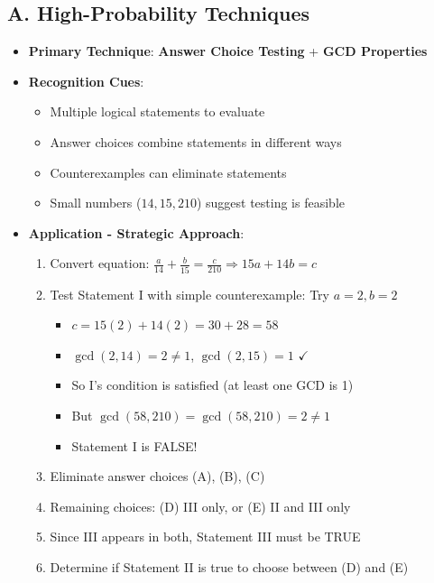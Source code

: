 \documentclass[12pt]{article}
\begin{document}
\begin{techniquesbox}
\subsection*{A. High-Probability Techniques}
\begin{itemize}[leftmargin=*]
    \item \textbf{Primary Technique}: \textbf{Answer Choice Testing} + \textbf{GCD Properties}
    \item \textbf{Recognition Cues}: 
    \begin{itemize}
        \item Multiple logical statements to evaluate
        \item Answer choices combine statements in different ways
        \item Counterexamples can eliminate statements
        \item Small numbers ($14, 15, 210$) suggest testing is feasible
    \end{itemize}
    \item \textbf{Application - Strategic Approach}: 
    \begin{enumerate}
        \item Convert equation: $\frac{a}{14}+\frac{b}{15}=\frac{c}{210} \Rightarrow 15a + 14b = c$
        \item Test Statement I with simple counterexample: Try $a=2, b=2$
        \begin{itemize}
            \item $c = 15(2) + 14(2) = 30 + 28 = 58$
            \item $\gcd(2, 14) = 2 \neq 1$, $\gcd(2, 15) = 1$ $\checkmark$
            \item So I's condition is satisfied (at least one GCD is 1)
            \item But $\gcd(58, 210) = \gcd(58, 210) = 2 \neq 1$
            \item Statement I is FALSE!
        \end{itemize}
        \item Eliminate answer choices (A), (B), (C)
        \item Remaining choices: (D) III only, or (E) II and III only
        \item Since III appears in both, Statement III must be TRUE
        \item Determine if Statement II is true to choose between (D) and (E)
    \end{enumerate}
\end{itemize}


\end{techniquesbox}
\end{document}
